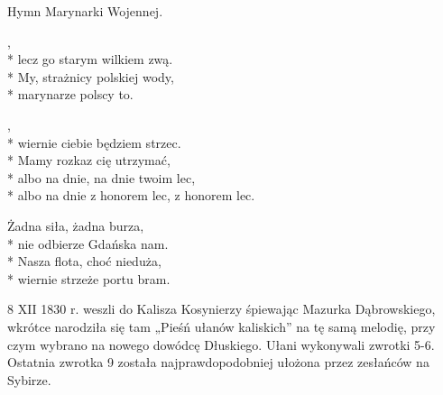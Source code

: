 \begin{info}Hymn Marynarki Wojennej.\end{info}

\begin{lyrics}[longestline={albo na dnie z honorem lec, z honorem lec.}]

,\\*
lecz go starym wilkiem zwą.\\*
My, strażnicy polskiej wody,\\*
marynarze polscy to.

\begin{chorus}
,\\*
wiernie ciebie będziem strzec.\\*
Mamy rozkaz cię utrzymać,\\*
albo na dnie, na dnie twoim lec,\\*
albo na dnie z honorem lec, z honorem lec.
\end{chorus}

Żadna siła, żadna burza,\\*
nie odbierze Gdańska nam.\\*
Nasza flota, choć nieduża,\\*
wiernie strzeże portu bram.

\chorusref
\end{lyrics}



\begin{info}8 XII 1830 r. weszli do Kalisza Kosynierzy śpiewając Mazurka Dąbrowskiego, wkrótce narodziła się tam „Pieśń ułanów kaliskich” na tę samą melodię, przy czym wybrano na nowego dowódcę Dłuskiego. Ułani wykonywali zwrotki 5-6. Ostatnia zwrotka 9 została najprawdopodobniej ułożona przez zesłańców na Sybirze.\end{info}


